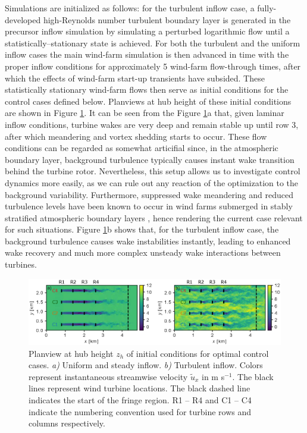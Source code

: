 Simulations are initialized as follows: for the turbulent inflow case, a fully-developed high-Reynolds number turbulent boundary layer is generated in the precursor inflow simulation by simulating a perturbed logarithmic flow until a statistically--stationary state is achieved. For both the turbulent and the uniform inflow cases the main wind-farm simulation is then advanced in time with the proper inflow conditions for approximately 5 wind-farm flow-through times, after which the effects of wind-farm start-up transients have subsided. These statistically stationary wind-farm flows then serve as initial conditions for the control cases defined below. Planviews at hub height of these initial conditions are shown in Figure \ref{fig:initial_conditions_flow_yaw}. It can be seen from the Figure \ref{fig:initial_conditions_flow_yaw}a that, given laminar inflow conditions, turbine wakes are very deep and remain stable up until row 3, after which meandering and vortex shedding starts to occur. These flow conditions can be regarded as somewhat articifial since, in the atmospheric boundary layer, background turbulence typically causes instant wake transition behind the turbine rotor. Nevertheless, this setup allows us to investigate control dynamics more easily, as we can rule out any reaction of the optimization to the background variability. Furthermore, suppressed wake meandering and reduced turbulence levels have been known to occur in wind farms submerged in stably stratified atmospheric boundary layers \citep{larsen2009dependence, machefaux2016experimental}, hence rendering the current case relevant for such situations. Figure \ref{fig:initial_conditions_flow_yaw}b shows that, for the turbulent inflow case, the background turbulence causes wake instabilities instantly, leading to enhanced wake recovery and much more complex unsteady wake interactions between turbines.

\begin{figure}
	\includegraphics[width=\textwidth]{chapters/optimal_yaw_control/domain_rast_RC.eps}
	\caption{Planview at hub height $z_h$ of initial conditions for optimal control cases. \emph{a)} Uniform and steady inflow. \emph{b)} Turbulent inflow. Colors represent instantaneous streamwise velocity $\widetilde{u}_x$ in m s$^{-1}$. The black lines represent wind turbine locations. The black dashed line indicates the start of the fringe region. R1 -- R4 and C1 -- C4 indicate the numbering convention used for turbine rows and columns respectively. \label{fig:initial_conditions_flow_yaw}}
\end{figure}

